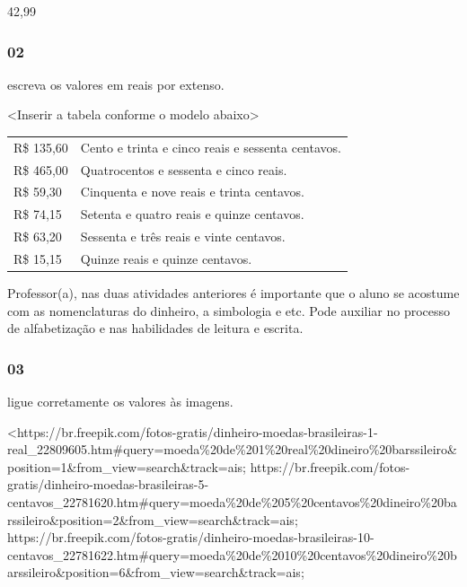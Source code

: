 42,99

\subsubsection{02}\label{section-55}

escreva os valores em reais por extenso.

\textless{}Inserir a tabela conforme o modelo abaixo\textgreater{}

\begin{longtable}[]{@{}ll@{}}
\toprule
R\$ 135,60 & Cento e trinta e cinco reais e sessenta
centavos.\tabularnewline
R\$ 465,00 & Quatrocentos e sessenta e cinco reais.\tabularnewline
R\$ 59,30 & Cinquenta e nove reais e trinta centavos.\tabularnewline
R\$ 74,15 & Setenta e quatro reais e quinze centavos.\tabularnewline
R\$ 63,20 & Sessenta e três reais e vinte centavos.\tabularnewline
R\$ 15,15 & Quinze reais e quinze centavos.\tabularnewline
\bottomrule
\end{longtable}

Professor(a), nas duas atividades anteriores é importante que o aluno se
acostume com as nomenclaturas do dinheiro, a simbologia e etc. Pode
auxiliar no processo de alfabetização e nas habilidades de leitura e
escrita.

\subsubsection{03}\label{section-56}

ligue corretamente os valores às imagens.

\textless{}https://br.freepik.com/fotos-gratis/dinheiro-moedas-brasileiras-1-real\_22809605.htm\#query=moeda\%20de\%201\%20real\%20dineiro\%20barssileiro\&position=1\&from\_view=search\&track=ais;
https://br.freepik.com/fotos-gratis/dinheiro-moedas-brasileiras-5-centavos\_22781620.htm\#query=moeda\%20de\%205\%20centavos\%20dineiro\%20barssileiro\&position=2\&from\_view=search\&track=ais;
https://br.freepik.com/fotos-gratis/dinheiro-moedas-brasileiras-10-centavos\_22781622.htm\#query=moeda\%20de\%2010\%20centavos\%20dineiro\%20barssileiro\&position=6\&from\_view=search\&track=ais;

